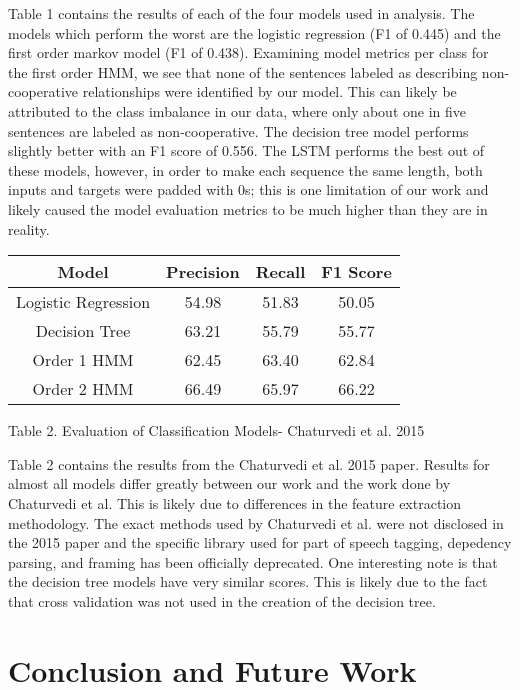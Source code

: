 \documentclass[11pt,a4paper]{article}
\begin{document}
Table 1 contains the results of each of the four models used in analysis. The models which perform the worst are the logistic regression (F1 of 0.445) and the first order markov model (F1 of 0.438). Examining model metrics per class for the first order HMM, we see that none of the sentences labeled as describing non-cooperative relationships were identified by our model. This can likely be attributed to the class imbalance in our data, where only about one in five sentences are labeled as non-cooperative. The decision tree model performs slightly better with an F1 score of 0.556. The LSTM performs the best out of these models, however, in order to make each sequence the same length, both inputs and targets were padded with 0s; this is one limitation of our work and likely caused the model evaluation metrics to be much higher than they are in reality. 

\begin{center}
 \begin{tabular}{||c c c c||} 
 \hline
 Model & Precision & Recall & F1 Score \\ [0.5ex] 
 \hline\hline
 Logistic Regression & 54.98 & 51.83 & 50.05 \\ 
 \hline
 Decision Tree & 63.21 & 55.79 & 55.77 \\
 \hline
 Order 1 HMM & 62.45 & 63.40 & 62.84 \\
  \hline
 Order 2 HMM & 66.49 & 65.97 & 66.22 \\
 \hline
\end{tabular}
\caption{Table 2. Evaluation of Classification Models- Chaturvedi et al. 2015}
\label{table:2}
\end{center}

Table 2 contains the results from the Chaturvedi et al. 2015 paper. Results for almost all models differ greatly between our work and the work done by Chaturvedi et al. This is likely due to differences in the feature extraction methodology. The exact methods used by Chaturvedi et al. were not disclosed in the 2015 paper and the specific library used for part of speech tagging, depedency parsing, and framing has been officially deprecated. One interesting note is that the decision tree models have very similar scores. This is likely due to the fact that cross validation was not used in the creation of the decision tree. 




\section{Conclusion and Future Work}
\end{document}

